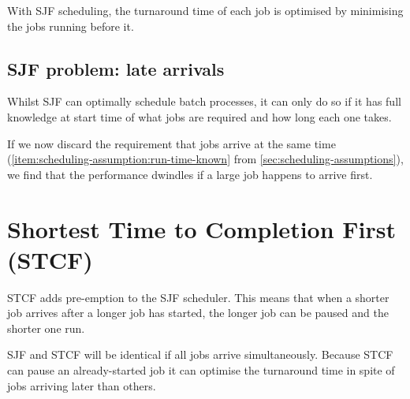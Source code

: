 With SJF scheduling, the turnaround time of each job is optimised by minimising the jobs running before it.

\subsection{SJF problem: late arrivals}

Whilst SJF can optimally schedule batch processes, it can only do so if it has full knowledge at start time of what jobs are required and how long each one takes.

If we now discard the requirement that jobs arrive at the same time (\ref{item:scheduling-assumption:run-time-known} from \autoref{sec:scheduling-assumptions}), we find that the performance dwindles if a large job happens to arrive first.

\section{Shortest Time to Completion First (STCF)}

STCF adds pre-emption to the SJF scheduler.
This means that when a shorter job arrives after a longer job has started, the longer job can be paused and the shorter one run.

SJF and STCF will be identical if all jobs arrive simultaneously.
Because STCF can pause an already-started job it can optimise the turnaround time in spite of jobs arriving later than others.

